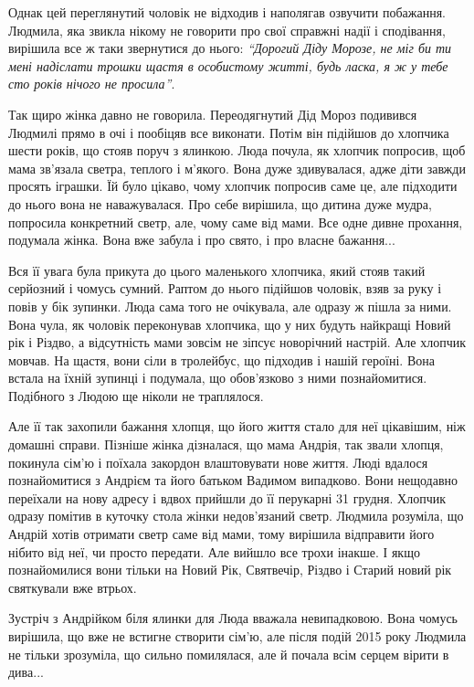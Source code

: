 Однак цей переглянутий чоловік не відходив і наполягав озвучити побажання.
Людмила, яка звикла нікому не говорити про свої справжні надії і сподівання,
вирішила все ж таки звернутися до нього: \emph{\enquote{Дорогий Діду Морозе, не міг би ти
мені надіслати трошки щастя в особистому житті, будь ласка, я ж у тебе сто
років нічого не просила}}.

Так щиро жінка давно не говорила. Переодягнутий Дід Мороз подивився Людмилі
прямо в очі і пообіцяв все виконати. Потім він підійшов до хлопчика шести
років, що стояв поруч з ялинкою. Люда почула, як хлопчик попросив, щоб мама
зв'язала светра, теплого і м'якого. Вона дуже здивувалася, адже діти завжди
просять іграшки. Їй було цікаво, чому хлопчик попросив саме це, але підходити
до нього вона не наважувалася. Про себе вирішила, що дитина дуже мудра,
попросила конкретний светр, але, чому саме від мами. Все одне дивне прохання,
подумала жінка. Вона вже забула і про свято, і про власне бажання...

Вся її увага була прикута до цього маленького хлопчика, який стояв такий
серйозний і чомусь сумний. Раптом до нього підійшов чоловік, взяв за руку і
повів у бік зупинки. Люда сама того не очікувала, але одразу ж пішла за ними.
Вона чула, як чоловік переконував хлопчика, що у них будуть найкращі Новий рік
і Різдво, а відсутність мами зовсім не зіпсує новорічний настрій. Але хлопчик
мовчав. На щастя, вони сіли в тролейбус, що підходив і нашій героїні. Вона
встала на їхній зупинці і подумала, що обов'язково з ними познайомитися.
Подібного з Людою ще ніколи не траплялося.

Але її так захопили бажання хлопця, що його життя стало для неї цікавішим, ніж
домашні справи. Пізніше жінка дізналася, що мама Андрія, так звали хлопця,
покинула сім'ю і поїхала закордон влаштовувати нове життя. Люді вдалося
познайомитися з Андрієм та його батьком Вадимом випадково. Вони нещодавно
переїхали на нову адресу і вдвох прийшли до її перукарні 31 грудня. Хлопчик
одразу помітив в куточку стола жінки недов'язаний светр. Людмила розуміла, що
Андрій хотів отримати светр саме від мами, тому вирішила відправити його нібито
від неї, чи просто передати. Але вийшло все трохи інакше. І якщо познайомилися
вони тільки на Новий Рік, Святвечір, Різдво і Старий новий рік святкували вже
втрьох.

Зустріч з Андрійком біля ялинки для Люда вважала невипадковою. Вона чомусь
вирішила, що вже не встигне створити сім'ю, але після подій 2015 року Людмила
не тільки зрозуміла, що сильно помилялася, але й почала всім серцем вірити в
дива...
